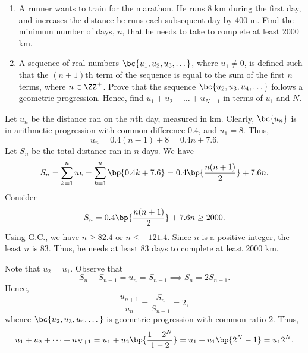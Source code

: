 \begin{problem}
    \begin{enumerate}
        \item A runner wants to train for the marathon. He runs 8 km during the first day, and increases the distance he runs each subsequent day by 400 m. Find the minimum number of days, $n$, that he needs to take to complete at least 2000 km.
        \item A sequence of real numbers $\bc{u_1, u_2, u_3, \dots}$, where $u_1 \neq 0$, is defined such that the $(n+1)$th term of the sequence is equal to the sum of the first $n$ terms, where $n \in \ZZ^+$. Prove that the sequence $\bc{u_2, u_3, u_4, \dots}$ follows a geometric progression. Hence, find $u_1 + u_2 + \dots + u_{N+1}$ in terms of $u_1$ and $N$.
    \end{enumerate}
\end{problem}
\begin{solution}
    \begin{ppart}
        Let $u_n$ be the distance ran on the $n$th day, measured in km. Clearly, $\bc{u_n}$ is in arithmetic progression with common difference 0.4, and $u_1 = 8$. Thus, \[u_n = 0.4(n-1) + 8 = 0.4n + 7.6.\] Let $S_n$ be the total distance ran in $n$ days. We have \[S_n = \sum_{k = 1}^n u_k = \sum_{k=1}^n \bp{0.4k + 7.6} = 0.4 \bp{\frac{n(n+1)}{2}} + 7.6n.\] Consider \[S_n = 0.4 \bp{\frac{n(n+1)}{2}} + 7.6n \geq 2000.\] Using G.C., we have $n \geq 82.4$ or $n \leq -121.4$. Since $n$ is a positive integer, the least $n$ is 83. Thus, he needs at least 83 days to complete at least 2000 km.
    \end{ppart}
    \begin{ppart}
        Note that $u_2 = u_1$. Observe that \[S_n - S_{n-1} = u_n = S_{n-1} \implies S_n = 2 S_{n-1}.\] Hence, \[\frac{u_{n+1}}{u_n} = \frac{S_n}{S_{n-1}} = 2,\] whence $\bc{u_2, u_3, u_4, \dots}$ is geometric progression with common ratio 2. Thus, \[u_1 + u_2 + \dots + u_{N+1} = u_1 + u_2 \bp{\frac{1 - 2^N}{1- 2}} = u_1 + u_1 \bp{2^N - 1} = u_1 2^N.\]
    \end{ppart}
\end{solution}

